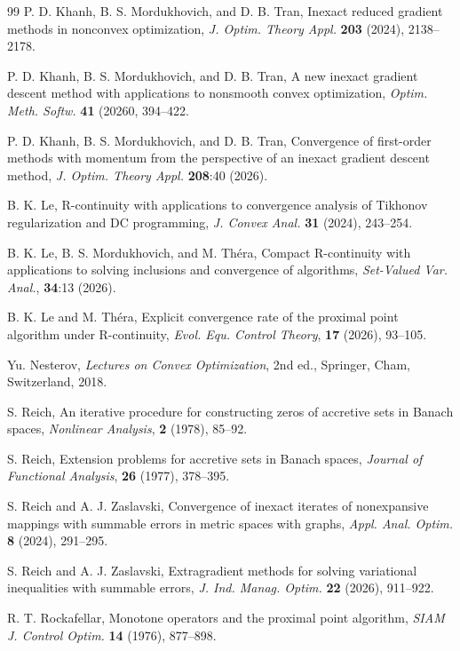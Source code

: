 \documentclass[12pt]{article}
\theoremstyle{plain}
\begin{document}
\begin{thebibliography}{99}
{\sc P. D. Khanh, B. S. Mordukhovich, and D. B. Tran}, Inexact reduced gradient methods in nonconvex
optimization, {\it J. Optim. Theory Appl.}
{\bf 203} (2024), 2138--2178.

{\sc P. D. Khanh, B. S. Mordukhovich, and D. B. Tran}, A new inexact gradient descent method
with applications to {nonsmooth} convex optimization, {\it Optim. Meth. Softw.} {\bf 41} (20260, 394--422.

{\sc P. D. Khanh, B. S. Mordukhovich, and D. B. Tran},
Convergence of first-order methods with momentum from the perspective of an inexact gradient descent method, {\it J. Optim. Theory Appl.}
{\bf 208}:40 (2026).

{\sc B. K. Le},
R-continuity with applications to convergence analysis of Tikhonov regularization and DC programming,
{\it J. Convex Anal.} {\bf 31} (2024), 243--254.

{\sc B. K. Le, B. S. Mordukhovich, and M. Th\'era},
Compact R-continuity with applications to solving inclusions and convergence of algorithms, {\it 
Set-Valued Var. Anal.},
{\bf 34}:13 (2026).

{\sc B. K. Le and M. Th\'era},
Explicit convergence rate of the proximal point algorithm under R-continuity, {\it Evol. Equ. Control Theory},
{\bf 17} (2026), 93--105.

{\sc Yu. Nesterov},
{\it Lectures on Convex Optimization},
2nd ed.,
Springer, Cham, Switzerland, 2018.

{ {\sc S. Reich}, An iterative procedure for constructing zeros of accretive sets in Banach spaces, {\it Nonlinear Analysis}, {\bf 2} (1978), 85--92.}

{ {\sc S. Reich}, Extension problems for accretive sets in Banach spaces, {\it Journal of Functional Analysis}, {\bf 26} (1977), 378--395.}

{\sc S. Reich and A. J. Zaslavski},
Convergence of inexact iterates of nonexpansive mappings with summable errors in metric spaces with graphs, {\it
Appl. Anal. Optim.}
{\bf 8} (2024), 291--295.


{\sc S. Reich and A. J. Zaslavski},
Extragradient methods for solving variational inequalities with summable errors, {\it J. Ind. Manag. Optim.}
{\bf 22} (2026), 911--922.

{\sc R. T. Rockafellar},
Monotone operators and the proximal point algorithm,
{\it SIAM J. Control Optim.}
{\bf 14} (1976), 877--898.


\end{thebibliography}
\end{document}
